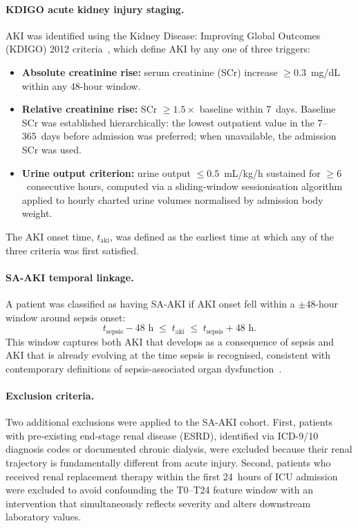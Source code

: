 \documentclass[11pt]{article}
\begin{document}
\paragraph{KDIGO acute kidney injury staging.}
AKI was identified using the Kidney Disease: Improving Global Outcomes (KDIGO)
2012 criteria~\citep{KDIGO2012}, which define AKI by any one of three triggers:
\begin{itemize}
  \item \textbf{Absolute creatinine rise:} serum creatinine (SCr) increase
        $\ge 0.3$~mg/dL within any 48-hour window.
  \item \textbf{Relative creatinine rise:} SCr $\ge 1.5\times$ baseline within
        7~days.  Baseline SCr was established hierarchically: the lowest
        outpatient value in the 7--365~days before admission was preferred; when
        unavailable, the admission SCr was used.
  \item \textbf{Urine output criterion:} urine output $\le 0.5$~mL/kg/h
        sustained for $\ge 6$~consecutive hours, computed via a sliding-window
        sessionisation algorithm applied to hourly charted urine volumes
        normalised by admission body weight.
\end{itemize}
The AKI onset time, $t_{\text{aki}}$, was defined as the earliest time at which
any of the three criteria was first satisfied.

\paragraph{SA-AKI temporal linkage.}
A patient was classified as having SA-AKI if AKI onset fell within a
$\pm 48$-hour window around sepsis onset:
\begin{equation}\label{eq:saaki-window}
  t_{\text{sepsis}} - 48\text{ h}
  \;\le\; t_{\text{aki}}
  \;\le\; t_{\text{sepsis}} + 48\text{ h}.
\end{equation}
This window captures both AKI that develops as a consequence of sepsis and AKI
that is already evolving at the time sepsis is recognised, consistent with
contemporary definitions of sepsis-associated organ
dysfunction~\citep{Kellum2021}.

\paragraph{Exclusion criteria.}
Two additional exclusions were applied to the SA-AKI cohort.  First, patients with pre-existing end-stage renal disease (ESRD), identified via ICD-9/10 diagnosis codes or documented chronic dialysis, were excluded because their renal trajectory is fundamentally different from acute injury.  Second, patients who received renal replacement therapy within the first 24~hours of ICU admission were excluded to avoid confounding the T0--T24 feature window with an intervention that simultaneously reflects severity and alters downstream laboratory values.
\end{document}
